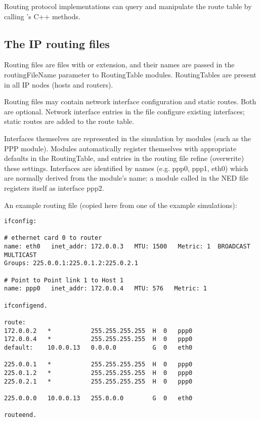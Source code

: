 Routing protocol implementations can query and manipulate the route table
by calling 's C++ methods.

% 
% 


\subsection{The IP routing files}

Routing files are files with  or  extension,
and their names are passed in the routingFileName parameter
to RoutingTable modules. RoutingTables are present in all
IP nodes (hosts and routers).

Routing files may contain network interface configuration and static
routes. Both are optional. Network interface entries in the file
configure existing interfaces; static routes are added to the route table.

Interfaces themselves are represented in the simulation by modules
(such as the PPP module). Modules automatically register themselves
with appropriate defaults in the RoutingTable, and entries in the
routing file refine (overwrite) these settings.
Interfaces are identified by names (e.g. ppp0, ppp1, eth0) which
are normally derived from the module's name: a module called
 in the NED file registers itself as interface ppp2.

An example routing file (copied here from one of the example simulations):

\begin{verbatim}
ifconfig:

# ethernet card 0 to router
name: eth0   inet_addr: 172.0.0.3   MTU: 1500   Metric: 1  BROADCAST MULTICAST
Groups: 225.0.0.1:225.0.1.2:225.0.2.1

# Point to Point link 1 to Host 1
name: ppp0   inet_addr: 172.0.0.4   MTU: 576   Metric: 1

ifconfigend.

route:
172.0.0.2   *           255.255.255.255  H  0   ppp0
172.0.0.4   *           255.255.255.255  H  0   ppp0
default:    10.0.0.13   0.0.0.0          G  0   eth0

225.0.0.1   *           255.255.255.255  H  0   ppp0
225.0.1.2   *           255.255.255.255  H  0   ppp0
225.0.2.1   *           255.255.255.255  H  0   ppp0

225.0.0.0   10.0.0.13   255.0.0.0        G  0   eth0

routeend.
\end{verbatim}

